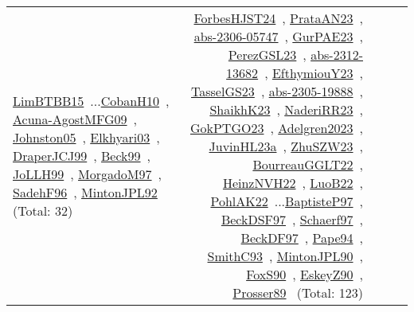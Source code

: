 {\begin{longtable}{p{3cm}r>{\raggedright\arraybackslash}p{6cm}>{\raggedright\arraybackslash}p{6cm}>{\raggedright\arraybackslash}p{8cm}}
\href{../works/LimBTBB15.pdf}{LimBTBB15}~\cite{LimBTBB15}...\href{../works/CobanH10.pdf}{CobanH10}~\cite{CobanH10}, \href{../works/Acuna-AgostMFG09.pdf}{Acuna-AgostMFG09}~\cite{Acuna-AgostMFG09}, \href{../works/Johnston05.pdf}{Johnston05}~\cite{Johnston05}, \href{../works/Elkhyari03.pdf}{Elkhyari03}~\cite{Elkhyari03}, \href{../works/DraperJCJ99.pdf}{DraperJCJ99}~\cite{DraperJCJ99}, \href{../works/Beck99.pdf}{Beck99}~\cite{Beck99}, \href{../works/JoLLH99.pdf}{JoLLH99}~\cite{JoLLH99}, \href{../works/MorgadoM97.pdf}{MorgadoM97}~\cite{MorgadoM97}, \href{../works/SadehF96.pdf}{SadehF96}~\cite{SadehF96}, \href{../works/MintonJPL92.pdf}{MintonJPL92}~\cite{MintonJPL92} (Total: 32) & \href{../works/ForbesHJST24.pdf}{ForbesHJST24}~\cite{ForbesHJST24}, \href{../works/PrataAN23.pdf}{PrataAN23}~\cite{PrataAN23}, \href{../works/abs-2306-05747.pdf}{abs-2306-05747}~\cite{abs-2306-05747}, \href{../works/GurPAE23.pdf}{GurPAE23}~\cite{GurPAE23}, \href{../works/PerezGSL23.pdf}{PerezGSL23}~\cite{PerezGSL23}, \href{../works/abs-2312-13682.pdf}{abs-2312-13682}~\cite{abs-2312-13682}, \href{../works/EfthymiouY23.pdf}{EfthymiouY23}~\cite{EfthymiouY23}, \href{../works/TasselGS23.pdf}{TasselGS23}~\cite{TasselGS23}, \href{../works/abs-2305-19888.pdf}{abs-2305-19888}~\cite{abs-2305-19888}, \href{../works/ShaikhK23.pdf}{ShaikhK23}~\cite{ShaikhK23}, \href{../works/NaderiRR23.pdf}{NaderiRR23}~\cite{NaderiRR23}, \href{../works/GokPTGO23.pdf}{GokPTGO23}~\cite{GokPTGO23}, \href{../works/Adelgren2023.pdf}{Adelgren2023}~\cite{Adelgren2023}, \href{../works/JuvinHL23a.pdf}{JuvinHL23a}~\cite{JuvinHL23a}, \href{../works/ZhuSZW23.pdf}{ZhuSZW23}~\cite{ZhuSZW23}, \href{../works/BourreauGGLT22.pdf}{BourreauGGLT22}~\cite{BourreauGGLT22}, \href{../works/HeinzNVH22.pdf}{HeinzNVH22}~\cite{HeinzNVH22}, \href{../works/LuoB22.pdf}{LuoB22}~\cite{LuoB22}, \href{../works/PohlAK22.pdf}{PohlAK22}~\cite{PohlAK22}...\href{../works/BaptisteP97.pdf}{BaptisteP97}~\cite{BaptisteP97}, \href{../works/BeckDSF97.pdf}{BeckDSF97}~\cite{BeckDSF97}, \href{../works/Schaerf97.pdf}{Schaerf97}~\cite{Schaerf97}, \href{../works/BeckDF97.pdf}{BeckDF97}~\cite{BeckDF97}, \href{../works/Pape94.pdf}{Pape94}~\cite{Pape94}, \href{../works/SmithC93.pdf}{SmithC93}~\cite{SmithC93}, \href{../works/MintonJPL90.pdf}{MintonJPL90}~\cite{MintonJPL90}, \href{../works/FoxS90.pdf}{FoxS90}~\cite{FoxS90}, \href{../works/EskeyZ90.pdf}{EskeyZ90}~\cite{EskeyZ90}, \href{../works/Prosser89.pdf}{Prosser89}~\cite{Prosser89} (Total: 123)\\

\end{longtable}}

